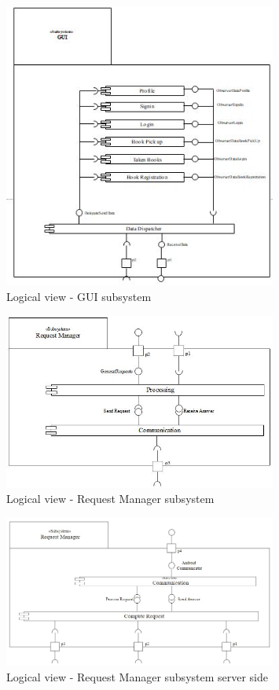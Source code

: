 \begin{figure}[h!]
	\centering
	\includegraphics[width=0.8\textwidth]{Immagini/GUI_subsys}
	\caption{Logical view - GUI subsystem}
	\label{fig:LogicalView_GUIsubsys}
\end{figure}
\begin{figure}[h!]
	\centering
	\includegraphics[width=0.8\textwidth]{Immagini/RequestManager_subsys}
	\caption{Logical view - Request Manager subsystem}
	\label{fig:LogicalView_RMsubsys}
\end{figure}
\begin{figure}[h!]
	\centering
	\includegraphics[width=0.8\textwidth]{Immagini/RequestManagerSrv_subsys}
	\caption{Logical view - Request Manager subsystem server side}
	\label{fig:LogicalView_RM_server_subsys}
\end{figure}
